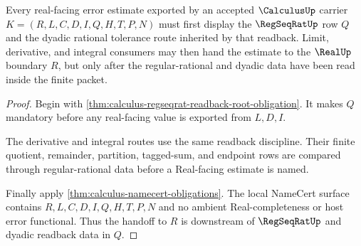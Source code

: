 \begin{theorem}
\label{thm:calculus-real-regseqrat-error-handoff}
Every real-facing error estimate exported by an accepted $\CalculusUp$ carrier $K=(R,L,C,D,I,Q,H,T,P,N)$ must first display the $\RegSeqRatUp$ row $Q$ and the dyadic rational tolerance route inherited by that readback. Limit, derivative, and integral consumers may then hand the estimate to the $\RealUp$ boundary $R$, but only after the regular-rational and dyadic data have been read inside the finite packet.
\end{theorem}
\begin{proof}
Begin with \autoref{thm:calculus-regseqrat-readback-root-obligation}. It makes $Q$ mandatory before any real-facing value is exported from $L,D,I$.

The derivative and integral routes use the same readback discipline. Their finite quotient, remainder, partition, tagged-sum, and endpoint rows are compared through regular-rational data before a Real-facing estimate is named.

Finally apply \autoref{thm:calculus-namecert-obligations}. The local NameCert surface contains $R,L,C,D,I,Q,H,T,P,N$ and no ambient Real-completeness or host error functional. Thus the handoff to $R$ is downstream of $\RegSeqRatUp$ and dyadic readback data in $Q$.
\end{proof}

